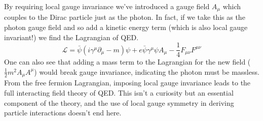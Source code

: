 By requiring local gauge invariance we've introduced a gauge field $A_\mu$ which couples to the Dirac particle just as the photon. In fact, if we take this as the photon gauge field and so add a kinetic energy term (which is also local gauge invariant!) we find the Lagrangian of QED. 
\begin{equation}
\mathcal{L} = \bar{\psi}(i\gamma^\mu\partial_\mu-m)\psi + e\bar{\psi}\gamma^\mu\psi A_\mu -\frac{1}{4} F_{\mu\nu}F^{\mu\nu}
\end{equation}
One can also see that adding a mass term to the Lagrangian for the new field ($\frac{1}{2}m^2A_\mu A^\mu$) would break gauge invariance, indicating the photon must be massless. From the free fermion Lagrangian, imposing local gauge invariance leads to the full interacting field theory of QED. This isn't a curiosity but an essential component of the theory, and the use of local gauge symmetry in deriving particle interactions doesn't end here.
